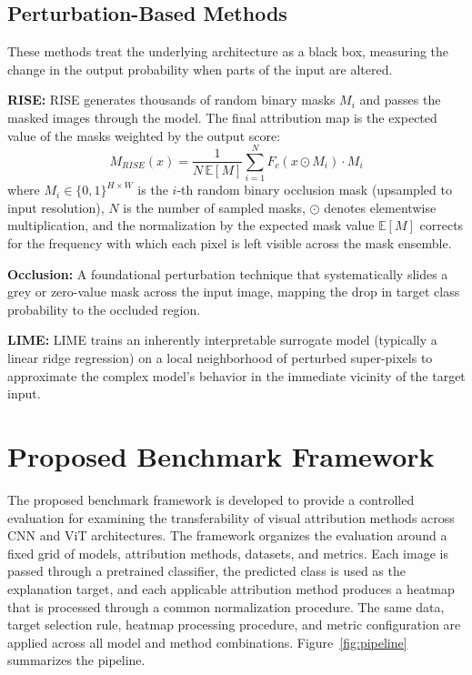 \documentclass[final,5p,times,twocolumn]{elsarticle}
\begin{document}
\subsection{Perturbation-Based Methods}
These methods treat the underlying architecture as a black box, measuring the change in the output probability when parts of the input are altered.

\textbf{RISE:} RISE generates thousands of random binary masks $M_i$ and passes the masked images through the model. The final attribution map is the expected value of the masks weighted by the output score:
\begin{equation}
M_{RISE}(x) = \frac{1}{N \, \mathbb{E}[M]} \sum_{i=1}^{N} F_c(x \odot M_i) \cdot M_i
\end{equation}
where $M_i \in \{0,1\}^{H \times W}$ is the $i$-th random binary occlusion mask (upsampled to input resolution), $N$ is the number of sampled masks, $\odot$ denotes elementwise multiplication, and the normalization by the expected mask value $\mathbb{E}[M]$ corrects for the frequency with which each pixel is left visible across the mask ensemble.

\textbf{Occlusion:} A foundational perturbation technique that systematically slides a grey or zero-value mask across the input image, mapping the drop in target class probability to the occluded region.

\textbf{LIME:} LIME trains an inherently interpretable surrogate model (typically a linear ridge regression) on a local neighborhood of perturbed super-pixels to approximate the complex model's behavior in the immediate vicinity of the target input.

\section{Proposed Benchmark Framework}
\label{sec:framework}

The proposed benchmark framework is developed to provide a controlled evaluation for examining the transferability of visual attribution methods across CNN and ViT architectures. The framework organizes the evaluation around a fixed grid of models, attribution methods, datasets, and metrics. Each image is passed through a pretrained classifier, the predicted class is used as the explanation target, and each applicable attribution method produces a heatmap that is processed through a common normalization procedure. The same data, target selection rule, heatmap processing procedure, and metric configuration are applied across all model and method combinations. Figure~\ref{fig:pipeline} summarizes the pipeline.
\end{document}
